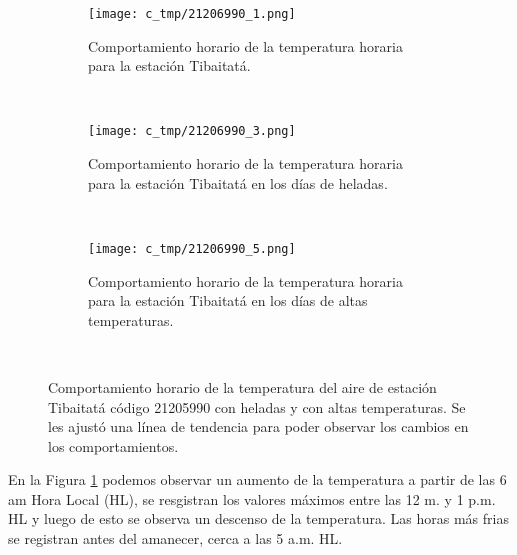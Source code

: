 \begin{figure}[H]
\begin{subfigure}[b]{0.5\textwidth}
\begin{center}
\caption{Comportamiento horario de la temperatura horaria para la estación Tibaitatá.}
\texttt{[image: c\_tmp/21206990\_1.png]}
\label{gra:sin_filtro}
        \end{center}
\end{subfigure}
~
\begin{subfigure}[b]{0.5\textwidth}
\begin{center}
\caption{Comportamiento horario de la temperatura horaria para la estación Tibaitatá en los días de heladas.}
\texttt{[image: c\_tmp/21206990\_3.png]}
\label{gra:helada}
\end{center}    
\end{subfigure}
~
\centering
\begin{subfigure}[b]{0.5\textwidth}
\begin{center}
\caption{Comportamiento horario de la temperatura horaria para la estación Tibaitatá en los días de altas temperaturas.}
\texttt{[image: c\_tmp/21206990\_5.png]}
\label{gra:altas}
\end{center}    
\end{subfigure}
~

\caption{Comportamiento horario de la temperatura del aire de estación Tibaitatá código 21205990 con heladas y con altas temperaturas. Se les ajustó una línea de tendencia para poder observar los cambios en los comportamientos.}
\end{figure}  

En la Figura \ref{gra:sin_filtro} podemos observar un aumento de la temperatura a partir de las 6 am Hora Local (HL), se resgistran los valores máximos entre las 12 m. y 1 p.m. HL y luego de esto se observa un descenso de la temperatura. Las horas más frias se registran antes del amanecer, cerca a las 5 a.m. HL.\\

